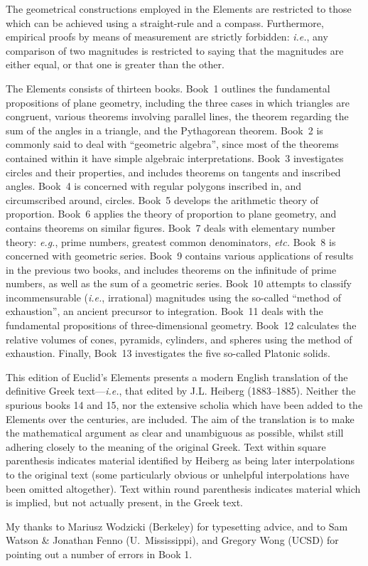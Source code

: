 The geometrical constructions employed in the Elements are restricted to
those which can be achieved using a straight-rule and a compass.
Furthermore, empirical proofs by means of measurement are strictly forbidden:
{\em i.e.}, 
any comparison of two magnitudes is restricted to saying that the magnitudes
are either equal, or that one is greater than the other.

The Elements consists of thirteen books. Book~1 outlines the fundamental
propositions of plane geometry, including the three cases in which
triangles are congruent, various theorems involving parallel lines, the theorem regarding the sum of the angles in a triangle, and the
Pythagorean theorem. Book~2 is commonly said to deal with ``geometric algebra'', since most of the theorems contained within it have simple algebraic
interpretations.
Book~3 investigates circles and their properties, and includes
theorems on tangents and inscribed angles. Book~4
is concerned with regular polygons inscribed in, and circumscribed around, circles.
Book~5 develops the arithmetic theory of proportion.
Book~6 applies the theory of proportion to plane geometry, and
contains theorems on similar figures. Book~7 deals
with elementary number theory: {\em e.g.}, prime numbers,
greatest common denominators, {\em etc.} Book~8 is concerned with geometric
series. Book~9 contains various applications of  results in the
previous two books, and includes theorems on the
infinitude of prime numbers, as well as the sum of a geometric series.
Book~10 attempts to classify incommensurable ({\em i.e.}, irrational)
magnitudes using the so-called ``method of exhaustion'', an ancient precursor to integration. Book~11 deals with the fundamental propositions of
three-dimensional geometry. Book~12 calculates the relative volumes of
cones, pyramids, cylinders, and spheres using the method of exhaustion.
Finally, Book~13 investigates the five so-called Platonic solids.

This  edition of Euclid's Elements presents a modern English translation of the definitive Greek text---{\em i.e.}, that edited by J.L. Heiberg (1883--1885). 
Neither the spurious
books 14 and 15, nor the extensive scholia which have been added to
the Elements over the centuries, are included.
The aim of the translation is to make the mathematical argument as clear and unambiguous as possible, whilst still adhering closely to  the meaning of the original Greek. Text within square parenthesis indicates material identified by Heiberg as being later interpolations to the original text (some particularly obvious or unhelpful interpolations have been omitted  
altogether). Text within round parenthesis indicates material which is implied, but not actually present, in the Greek text. 

My thanks to Mariusz Wodzicki (Berkeley) for typesetting advice, and
to Sam Watson \& Jonathan Fenno (U.\ Mississippi), and  Gregory Wong (UCSD) for pointing out a number of errors in Book 1.